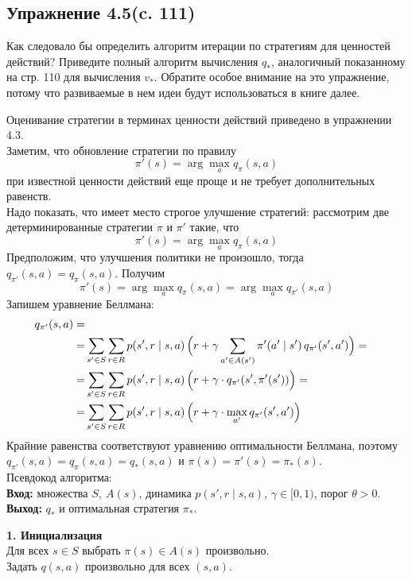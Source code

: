 \subsection{Упражнение 4.5(c. 111)}
Как следовало бы определить алгоритм итерации по стратегиям
для ценностей действий? Приведите полный алгоритм вычисления $q_*$, аналогичный показанному на стр. 110 для вычисления $v_*$. Обратите особое внимание на это упражнение, потому что развиваемые в нем идеи будут использоваться в книге далее. 
\begin{solution}
    Оценивание стратегии в терминах ценности действий приведено в упражнении 4.3. \\
    Заметим, что обновление стратегии по правилу
    \[\pi'(s) = \arg\max_aq_{\pi}(s, a)\]
    при известной ценности действий еще проще и не требует дополнительных равенств. \\
    Надо показать, что имеет место строгое улучшение стратегий:
    рассмотрим две детерминированные стратегии $\pi$ и $\pi'$ такие, что \[\pi'(s) = \arg\max_aq_{\pi}(s, a)\] 
    Предположим, что улучшения политики не произошло, тогда $q_{\pi'}(s,a) = q_{\pi}(s,a)$.
    Получим
    \[\pi'(s) = \arg\max_aq_{\pi}(s, a) = 
    \arg\max_aq_{\pi'}(s, a) \]
    Запишем уравнение Беллмана:
    \begin{align*}
        q_{\pi'}(s,a) = \\
        =& \sum_{s'\in S}\sum_{r\in R} p(s',r\mid s,a)\,\Bigl(r + \gamma\sum_{a'\in A(s')} \pi'(a'\mid s')\, q_{\pi'}(s',a')\Bigr) =\\
        =& \sum_{s'\in S}\sum_{r\in R} p(s',r\mid s,a)\,\Bigl(r + \gamma \cdot q_{\pi'}(s',\pi'(s'))\Bigr) =\\
        =& \sum_{s'\in S}\sum_{r\in R} p(s',r\mid s,a)\,\Bigl(r + \gamma \cdot \max_{a'} q_{\pi'}(s',a')\Bigr)
    \end{align*}
    Крайние равенства соответствуют уравнению оптимальности Беллмана, поэтому $q_{\pi'}(s,a) = q_{\pi}(s,a) = q_*(s,a)$ и $\pi(s) = \pi'(s) = \pi_*(s)$.
    \vspace{5mm} \\
    Псевдокод алгоритма: \\
    \textbf{Вход:} множества $S,\ A(s)$, динамика $p(s',r\mid s,a)$, $\gamma\in[0,1)$, порог $\theta>0$.\\
    \textbf{Выход:} $q_*$ и оптимальная стратегия $\pi_*$.
    
    \textbf{1. Инициализация}\\
    Для всех $s\in S$ выбрать $\pi(s)\in A(s)$ произвольно.\\
    Задать $q(s,a)$ произвольно для всех $(s,a)$.
    

\end{solution}

